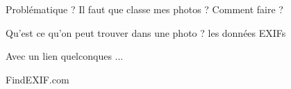 Problématique ? 
	Il faut que classe mes photos ?  Comment faire ?


	

Qu'est ce qu'on peut trouver dans une photo ? 
les données EXIFs 

Avec un lien quelconques ... 

FindEXIF.com 

